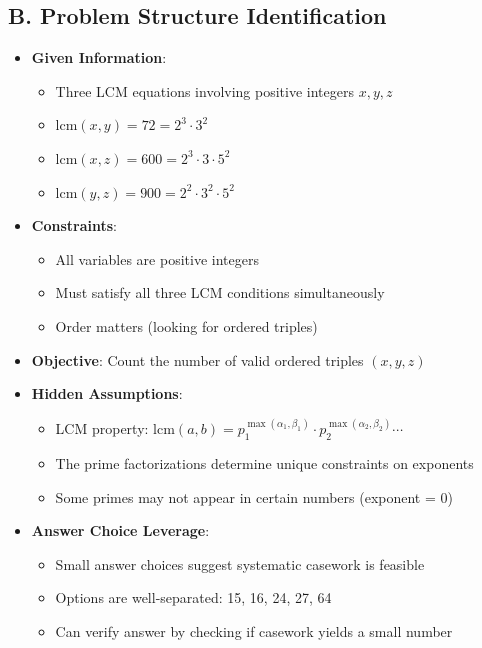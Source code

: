 \documentclass[12pt]{article}
\begin{document}
\begin{problemconfigbox}
\subsection*{B. Problem Structure Identification}
\begin{itemize}[leftmargin=*]
    \item \textbf{Given Information}: 
    \begin{itemize}
        \item Three LCM equations involving positive integers $x, y, z$
        \item $\text{lcm}(x,y) = 72 = 2^3 \cdot 3^2$
        \item $\text{lcm}(x,z) = 600 = 2^3 \cdot 3 \cdot 5^2$
        \item $\text{lcm}(y,z) = 900 = 2^2 \cdot 3^2 \cdot 5^2$
    \end{itemize}
    \item \textbf{Constraints}: 
    \begin{itemize}
        \item All variables are positive integers
        \item Must satisfy all three LCM conditions simultaneously
        \item Order matters (looking for ordered triples)
    \end{itemize}
    \item \textbf{Objective}: Count the number of valid ordered triples $(x,y,z)$
    \item \textbf{Hidden Assumptions}: 
    \begin{itemize}
        \item LCM property: $\text{lcm}(a,b) = p_1^{\max(\alpha_1,\beta_1)} \cdot p_2^{\max(\alpha_2,\beta_2)} \cdots$
        \item The prime factorizations determine unique constraints on exponents
        \item Some primes may not appear in certain numbers (exponent = 0)
    \end{itemize}
    \item \textbf{Answer Choice Leverage}: 
    \begin{itemize}
        \item Small answer choices suggest systematic casework is feasible
        \item Options are well-separated: 15, 16, 24, 27, 64
        \item Can verify answer by checking if casework yields a small number
    \end{itemize}
\end{itemize}


\end{problemconfigbox}
\end{document}
